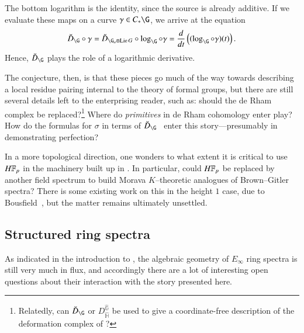 \begin{enumerate}
    \begin{center}
    \end{center}
    The bottom logarithm is the identity, since the source is already additive.  If we evaluate these maps on a curve $\gamma \in C_* \G$, we arrive at the equation~\cite[V.8.5]{LazardCFGs} \[\breve D_{\G} \circ \gamma = \breve D_{\G_a \otimes \Lie G} \circ \log_{\G} \circ \gamma = \frac{d}{dt} \left( (\log_\G \circ \gamma)(t) \right).\]  Hence, $\breve D_{\G}$ plays the role of a logarithmic derivative.
\end{enumerate}

The conjecture, then, is that these pieces go much of the way towards describing a local residue pairing internal to the theory of formal groups, but there are still several details left to the enterprising reader, such as: should the de Rham complex be replaced?\footnote{Relatedly, can $\breve D_{\G}$ or $D_{\widehat{\mathbb H}}^{\widehat{\mathbb G}}$ be used to give a coordinate-free description of the deformation complex of ?}  Where do \emph{primitives} in de Rham cohomology enter play?  How do the formulas for $\sigma$ in terms of $\breve D_{\G}$~\cite[VII.6.14]{LazardCFGs} enter this story---presumably in demonstrating perfection?

In a more topological direction, one wonders to what extent it is critical to use $\HFp$ in the machinery built up in .  In particular, could $\HFp$ be replaced by another field spectrum to build Morava $K$--theoretic analogues of Brown--Gitler spectra?  There is some existing work on this in the height $1$ case, due to Bousfield~\cite{BousfieldLambdaRings}, but the matter remains ultimately unsettled.





\subsection*{Structured ring spectra}

As indicated in the introduction to , the algebraic geometry of $E_\infty$ ring spectra is still very much in flux, and accordingly there are a lot of interesting open questions about their interaction with the story presented here.


